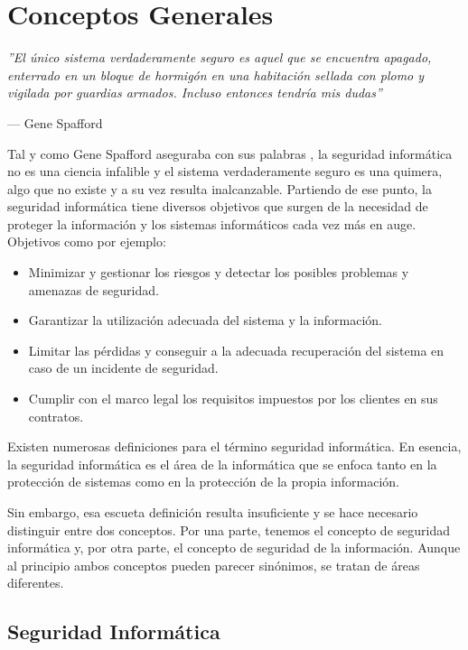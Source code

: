 \chapter{Conceptos Generales}

\epigraph{\textit{''El único sistema verdaderamente seguro es aquel que se encuentra apagado, enterrado en un bloque de hormigón en una habitación sellada con plomo y vigilada por guardias armados. Incluso entonces tendría mis dudas''}}{--- Gene Spafford}

Tal y como Gene Spafford aseguraba con sus palabras \cite{gene-spafford}, la seguridad informática no es una ciencia infalible y el sistema verdaderamente seguro es una quimera, algo que no existe y a su vez resulta inalcanzable. Partiendo de ese punto, la seguridad informática tiene diversos objetivos que surgen de la necesidad de proteger la información y los sistemas informáticos cada vez más en auge. Objetivos como por ejemplo:
\begin{itemize}
	\item Minimizar y gestionar los riesgos y detectar los posibles problemas y amenazas de seguridad.
	\item Garantizar la utilización adecuada del sistema y la información.
	\item Limitar las pérdidas y conseguir a la adecuada recuperación del sistema en caso de un incidente de seguridad.
	\item Cumplir con el marco legal los requisitos impuestos por los clientes en sus contratos.
\end{itemize}

Existen numerosas definiciones para el término seguridad informática. En esencia, la seguridad informática es el área de la informática que se enfoca tanto en la protección de sistemas como en la protección de la propia información. 

Sin embargo, esa escueta definición resulta insuficiente y se hace necesario distinguir entre dos conceptos. Por una parte, tenemos el concepto de seguridad informática y, por otra parte, el concepto de seguridad de la información. Aunque al principio ambos conceptos pueden parecer sinónimos, se tratan de áreas diferentes.


\section{Seguridad Informática}

